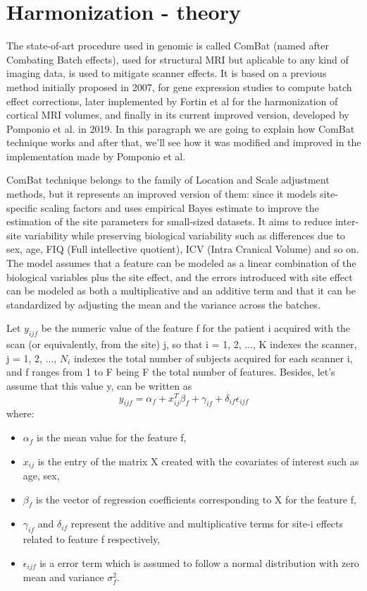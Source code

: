 \documentclass[10pt]{report}
\begin{document}
\section{Harmonization - theory}\label{sec:harmonizationtheory}


The state-of-art procedure used in genomic is called ComBat (named after Combating Batch effects), used for structural MRI but aplicable to any kind of imaging data, is used to mitigate scanner effects.
It is based on a previous method initially proposed in 2007, for gene expression studies to compute batch effect corrections, later implemented by Fortin et al \cite{fortin-2018} for the harmonization of cortical MRI volumes, and finally in its current improved version, developed by Pomponio et al. \cite{pomponio-2019} in 2019.
In this paragraph we are going to explain how ComBat technique works and after that, we'll see how it was modified and improved in the implementation made by Pomponio et al.

ComBat technique belongs to the family of Location and Scale adjustment methods, but it represents an improved version of them: since it models site-specific scaling factors and uses empirical Bayes estimate to improve the estimation of the site parameters for small-sized datasets.\cite{fortin-2018}
It aims to reduce inter-site variability while preserving biological variability such as differences due to sex, age, FIQ (Full intellective quotient), ICV (Intra Cranical Volume) and so on.
The model assumes that a feature can be modeled as a linear combination of the biological variables plus the site effect, and the errors introduced with site effect can be modeled as both a multiplicative and an additive term and that it can be standardized by adjusting the mean and the variance across the batches.

Let $y_{ijf}$ be the numeric value of the feature f for the patient i acquired with the scan (or equivalently, from the site) j, so that i = 1, 2, ..., K indexes the scanner, j = 1, 2, ..., $N_i$ indexes the total number of subjects acquired for each scanner i, and f ranges from 1 to F being F the total number of features. Besides, let's assume that this value y, can be written as
\begin{equation}
y_{ijf} = \alpha_f + x_{ij}^T \beta _f + \gamma_{if} + \delta_{if} \epsilon_{ijf}
\end{equation}
where:
\begin{itemize}
\item $\alpha_f$ is the mean value for the feature f,
\item $x_{ij}$ is the entry of the matrix X created with the covariates of interest such as age, sex,
\item $\beta_f$ is the vector of regression coefficients corresponding to X for the feature f,
\item $\gamma_{if}$ and $\delta_{if}$ represent the additive and multiplicative terms for site-i effects related to feature f respectively,
\item $\epsilon_{ijf}$ is a error term which is assumed to follow a normal distribution with zero mean and variance $\sigma_f^2$.
\end{itemize}
\end{document}
